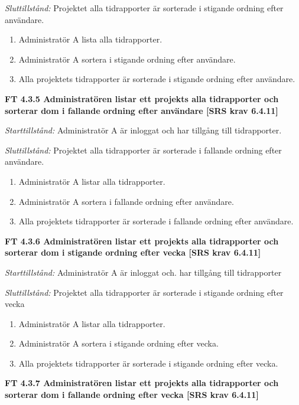 \documentclass[a4paper]{article}
\begin{document}
\emph{Sluttillstånd:} Projektet alla tidrapporter är sorterade i stigande ordning efter användare.

\begin{enumerate}
\item Administratör A lista alla tidrapporter.
\item Administratör A sortera i stigande ordning efter användare.
\item Alla projektets tidrapporter är sorterade i stigande ordning efter användare.
\end{enumerate}

\textbf{FT 4.3.5 Administratören listar ett projekts alla tidrapporter och sorterar dom i fallande ordning efter användare [SRS krav 6.4.11]}

\emph{Starttillstånd:} Administratör A är inloggat och har tillgång till tidrapporter.

\emph{Sluttillstånd:} Projektet alla tidrapporter är sorterade i fallande ordning efter användare.

\begin{enumerate}
\item Administratör A listar alla tidrapporter.
\item Administratör A sortera i fallande ordning efter användare.
\item Alla projektets tidrapporter är sorterade i fallande ordning efter användare.
\end{enumerate}

\textbf{FT 4.3.6 Administratören listar ett projekts alla tidrapporter och sorterar dom i stigande ordning efter vecka [SRS krav 6.4.11]}

\emph{Starttillstånd:} Administratör A är inloggat och. har tillgång till tidrapporter

\emph{Sluttillstånd:} Projektet alla tidrapporter är sorterade i stigande ordning efter vecka

\begin{enumerate}
\item Administratör A listar alla tidrapporter.
\item Administratör A sortera i stigande ordning efter vecka.
\item Alla projektets tidrapporter är sorterade i stigande ordning efter vecka.
\end{enumerate}

\textbf{FT 4.3.7 Administratören listar ett projekts alla tidrapporter och sorterar dom i fallande ordning efter vecka [SRS krav 6.4.11]}
\end{document}
